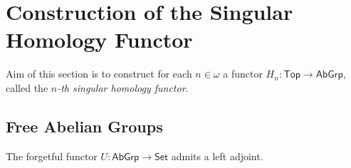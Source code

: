 \section*{Construction of the Singular Homology Functor}

Aim of this section is to construct for each $n \in \omega$ a functor $H_n : \mathsf{Top} \to \mathsf{AbGrp}$, called the \textit{$n$-th singular homology functor}.

\subsection*{Free Abelian Groups}

\begin{proposition}
	\label{prop:F_set_abgrp}
	The forgetful functor $U : \mathsf{AbGrp} \to \mathsf{Set}$ admits a left adjoint.	
\end{proposition}


